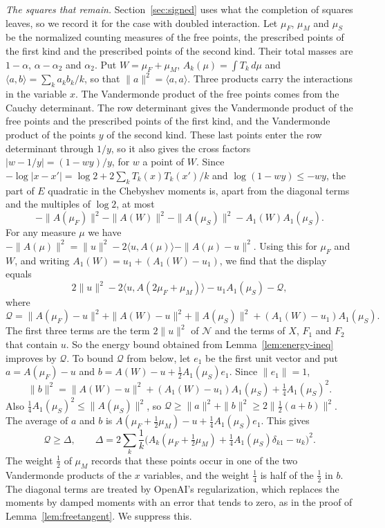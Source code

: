 \emph{The squares that remain.} Section~\ref{sec:signed} uses what the completion of squares leaves, so we record it for the case with doubled
interaction. Let $\mu_F$, $\mu_M$ and $\mu_S$ be the normalized counting measures of the free points, the prescribed points of the first kind and the
prescribed points of the second kind. Their total masses are $1-\alpha$, $\alpha-\alpha_2$ and $\alpha_2$. Put $W=\mu_F+\mu_M$,
$A_k(\mu)=\int T_k\,d\mu$ and $\langle a,b\rangle=\sum_ka_kb_k/k$, so that $\|a\|^2=\langle a,a\rangle$. Three products carry the interactions
in the variable $x$. The Vandermonde product of the free points comes from the Cauchy determinant. The row determinant gives the Vandermonde product of the
free points and the prescribed points of the first kind, and the Vandermonde product of the points $y$ of the second kind. These last points
enter the row determinant through $1/y$, so it also gives the cross factors $|w-1/y|=(1-wy)/y$, for $w$ a point of $W$.
Since $-\log|x-x'|=\log2+2\sum_kT_k(x)T_k(x')/k$ and $\log(1-wy)\le-wy$, the part of $E$ quadratic in the Chebyshev moments is, apart from the
diagonal terms and the multiples of $\log2$, at most
\[
 -\|A(\mu_F)\|^2-\|A(W)\|^2-\|A(\mu_S)\|^2-A_1(W)A_1(\mu_S).
\]
For any measure $\mu$ we have $-\|A(\mu)\|^2=\|u\|^2-2\langle u,A(\mu)\rangle-\|A(\mu)-u\|^2$. Using this for $\mu_F$ and $W$, and writing
$A_1(W)=u_1+(A_1(W)-u_1)$, we find that the display equals
\[
 2\|u\|^2-2\langle u,A(2\mu_F+\mu_M)\rangle-u_1A_1(\mu_S)-\mathcal Q,
\]
where
\[
 \mathcal Q=\|A(\mu_F)-u\|^2+\|A(W)-u\|^2+\|A(\mu_S)\|^2+(A_1(W)-u_1)A_1(\mu_S).
\]
The first three terms are the term $2\|u\|^2$ of $\mathcal N$ and the terms of $X$, $F_1$ and $F_2$ that contain $u$. So the energy bound obtained from
Lemma~\ref{lem:energy-ineq} improves by $\mathcal Q$. To bound $\mathcal Q$ from below, let $e_1$ be the first
unit vector and put $a=A(\mu_F)-u$ and $b=A(W)-u+\frac12A_1(\mu_S)e_1$. Since $\|e_1\|=1$,
\[
 \|b\|^2=\|A(W)-u\|^2+(A_1(W)-u_1)A_1(\mu_S)+\tfrac14A_1(\mu_S)^2 .
\]
Also $\frac14A_1(\mu_S)^2\le\|A(\mu_S)\|^2$, so $\mathcal Q\ge\|a\|^2+\|b\|^2\ge2\|\frac12(a+b)\|^2$. The average of $a$ and $b$ is
$A(\mu_F+\frac12\mu_M)-u+\frac14A_1(\mu_S)e_1$. This gives
\begin{equation}\label{eq:squares}
 \mathcal Q\ge\Delta,\qquad\Delta=2\sum_k\frac1k\bigl(A_k(\mu_F+\tfrac12\mu_M)+\tfrac14A_1(\mu_S)\delta_{k1}-u_k\bigr)^2 .
\end{equation}
The weight $\frac12$ of $\mu_M$ records that these points occur in one of the two Vandermonde products of the $x$ variables, and the weight
$\frac14$ is half of the $\frac12$ in $b$. The diagonal terms are treated by OpenAI's regularization, which replaces the moments by damped moments
with an error that tends to zero, as in the proof of Lemma~\ref{lem:freetangent}. We suppress this.

